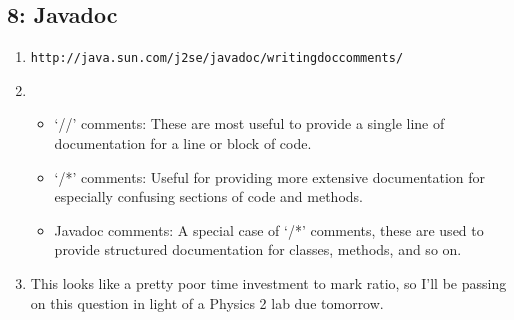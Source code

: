 \documentclass[10pt,letterpaper,titlepage]{article}
\begin{document}
\subsection*{8: Javadoc}
\begin{enumerate}
  \item \texttt{http://java.sun.com/j2se/javadoc/writingdoccomments/}

  \item 
    \begin{itemize}
      \item `//' comments: These are most useful to provide a single line of documentation for a line or block of code.
      \item `/*' comments: Useful for providing more extensive documentation for especially confusing sections of code and methods.
      \item Javadoc comments: A special case of `/*' comments, these are used to provide structured documentation for classes, methods, and so on.
    \end{itemize}
   \item This looks like a pretty poor time investment to mark ratio, so I'll be passing on this question in light of a Physics 2 lab due tomorrow.


\end{enumerate}
\end{document}
